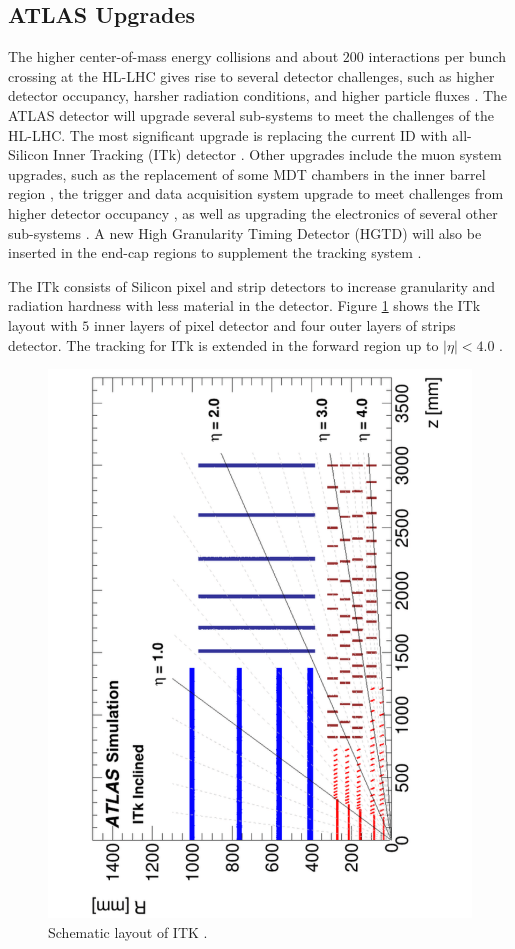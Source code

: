 \subsection{ATLAS Upgrades}
\label{subsec:ATLASUpgrade}
The higher center-of-mass energy collisions and about $200$ interactions per bunch crossing at the HL-LHC gives rise to several detector challenges, such as higher detector occupancy, harsher radiation conditions, and higher particle fluxes \cite{HLLHC}. The ATLAS detector will upgrade several sub-systems to meet the challenges of the HL-LHC. The most significant upgrade is replacing the current ID with all-Silicon Inner Tracking (ITk) detector \cite{HLLHC}. Other upgrades include the muon system upgrades, such as the replacement of some MDT chambers in the inner barrel region \cite{HLLHCMuon}, the trigger and data acquisition system upgrade to meet challenges from higher detector occupancy \cite{HLLHCTrigger}, as well as upgrading the electronics of several other sub-systems \cite{HLLHC}. A new High Granularity Timing Detector (HGTD) will also be inserted in the end-cap regions to supplement the tracking system \cite{HLLHC}.

The ITk consists of Silicon pixel and strip detectors to increase granularity and radiation hardness with less material in the detector. Figure \ref{fig:ITKLayout} shows the ITk layout with $5$ inner layers of pixel detector and four outer layers of strips detector. The tracking for ITk is extended in the forward region up to $|\eta| < 4.0$ \cite{ITkStripsTDR}. 

\begin{figure}[!htb]
    \centering
    \includegraphics[angle=270,width=.7\linewidth]{figures/LHC/ITKLayout.pdf}
    \caption{ Schematic layout of ITK \cite{ITkPixelTDR}.\label{fig:ITKLayout}}
\end{figure}

